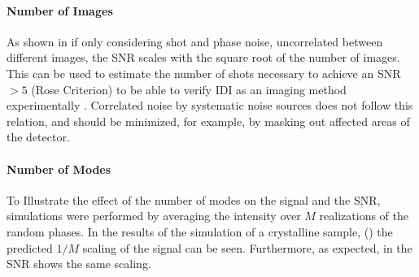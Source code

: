 \paragraph{Number of Images}
As shown in  if only considering shot and phase noise, uncorrelated between different  images, the SNR scales with the square root of the number of images.  This can be used to estimate the number of shots necessary to achieve an SNR\,$>5$ (Rose Criterion) to be able to verify IDI as an imaging method experimentally \cite{rose}. Correlated noise by systematic noise sources does not follow this relation, and should be minimized, for example, by masking out affected areas of the detector.

\paragraph{Number of Modes}
To Illustrate the effect of the number of modes on the signal and the SNR, simulations were performed by averaging the intensity over $M$ realizations of the random phases.  In the results of the simulation of a crystalline sample, () the predicted $1/M$ scaling of the signal can be seen. Furthermore, as expected, in  the SNR shows the same scaling.

